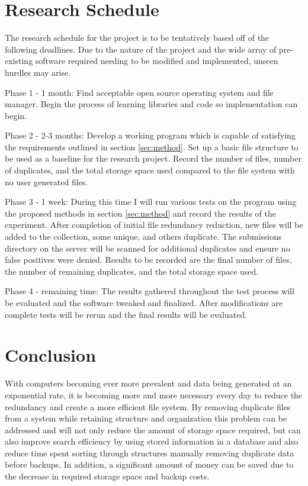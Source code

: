 \documentclass[11pt]{article}
\begin{document}
\vspace*{-.1in}
\section{Research Schedule}
\label{sec:schedule}
\vspace*{-.1in}

The research schedule for the project is to be tentatively based off of the following deadlines. Due to the nature of the project and the wide array of pre-existing software required needing to be modified and implemented, unseen hurdles may arise. 

Phase 1 - 1 month: Find acceptable open source operating system and file manager. Begin the process of learning libraries and code so implementation can begin.

Phase 2 - 2-3 months: Develop a working program which is capable of satisfying the requirements outlined in section \ref{sec:method}. Set up a basic file structure to be used as a baseline for the research project. Record the number of files, number of duplicates, and the total storage space used compared to the file system with no user generated files.

Phase 3 - 1 week: During this time I will run various tests on the program using the proposed methods in section \ref{sec:method} and record the results of the experiment. After completion of initial file redundancy reduction, new files will be added to the collection, some unique, and others duplicate. The submissions directory on the server will be scanned for additional duplicates and ensure no false positives were denied. Results to be recorded are the final number of files, the number of remaining duplicates, and the total storage space used.

Phase 4 - remaining time: The results gathered throughout the test process will be evaluated and the software tweaked and finalized. After modifications are complete tests will be rerun and the final results will be evaluated.

\vspace*{-.1in}
\section{Conclusion}
\label{sec:conclusion}
\vspace*{-.1in}

With computers becoming ever more prevalent and data being generated at an exponential rate, it is becoming more and more necessary every day to reduce the redundancy and create a more efficient file system. By removing duplicate files from a system while retaining structure and organization this problem can be addressed and will not only reduce the amount of storage space required, but can also improve search efficiency by using stored information in a database and also reduce time spent sorting through structures manually removing duplicate data before backups. In addition, a significant amount of money can be saved due to the decrease in required storage space and backup costs.

\newpage



\end{document}
